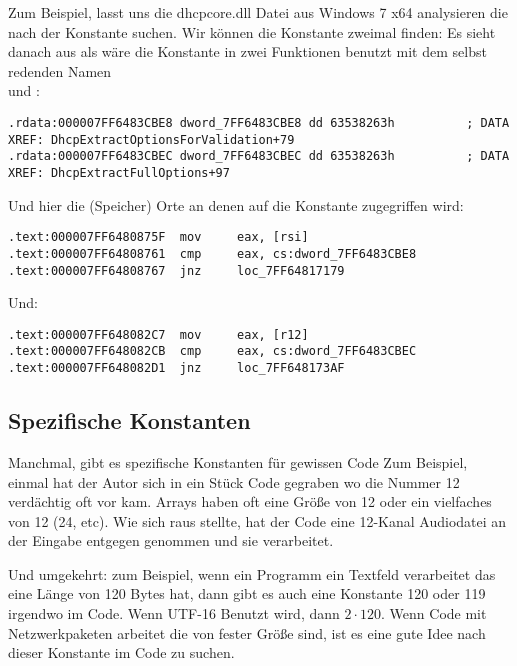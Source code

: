 Zum Beispiel, lasst uns die dhcpcore.dll Datei aus Windows 7 x64 analysieren die nach der Konstante suchen.
Wir k\"onnen die Konstante zweimal finden:
Es sieht danach aus als w\"are die Konstante in zwei Funktionen benutzt mit dem selbst redenden Namen\\
 und :

\begin{lstlisting}[caption=dhcpcore.dll (Windows 7 x64),style=customasmx86]
.rdata:000007FF6483CBE8 dword_7FF6483CBE8 dd 63538263h          ; DATA XREF: DhcpExtractOptionsForValidation+79
.rdata:000007FF6483CBEC dword_7FF6483CBEC dd 63538263h          ; DATA XREF: DhcpExtractFullOptions+97
\end{lstlisting}

Und hier die (Speicher) Orte an denen auf die Konstante zugegriffen wird:

\begin{lstlisting}[caption=dhcpcore.dll (Windows 7 x64),style=customasmx86]
.text:000007FF6480875F  mov     eax, [rsi]
.text:000007FF64808761  cmp     eax, cs:dword_7FF6483CBE8
.text:000007FF64808767  jnz     loc_7FF64817179
\end{lstlisting}

Und:

\begin{lstlisting}[caption=dhcpcore.dll (Windows 7 x64),style=customasmx86]
.text:000007FF648082C7  mov     eax, [r12]
.text:000007FF648082CB  cmp     eax, cs:dword_7FF6483CBEC
.text:000007FF648082D1  jnz     loc_7FF648173AF
\end{lstlisting}

\subsection{Spezifische Konstanten}

Manchmal, gibt es spezifische Konstanten f\"ur gewissen Code %
Zum Beispiel, einmal hat der Autor sich in ein St\"uck Code gegraben wo die Nummer 12 verd\"achtig
oft vor kam. Arrays haben oft eine Gr\"oße von 12 oder ein vielfaches von 12 (24, etc). 
Wie sich raus stellte, hat der Code eine 12-Kanal Audiodatei an der Eingabe entgegen genommen und
sie verarbeitet.

Und umgekehrt: zum Beispiel, wenn ein Programm ein Textfeld verarbeitet das eine L\"ange von 120 Bytes hat,
dann gibt es auch eine Konstante 120 oder 119 irgendwo im Code.
Wenn UTF-16 Benutzt wird, dann $2 \cdot 120$. Wenn Code mit Netzwerkpaketen arbeitet die von fester Gr\"oße
sind, ist es eine gute Idee nach dieser Konstante im Code zu suchen.


